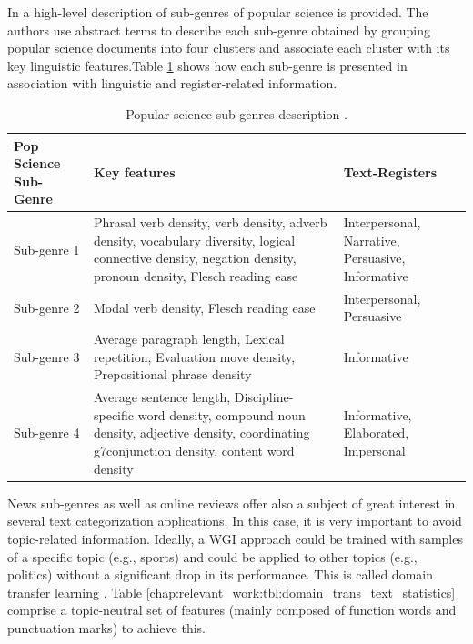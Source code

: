 In \parencite{lieungnapar2017genre} a high-level description of sub-genres of popular science is provided. The authors use abstract terms to describe each sub-genre obtained by grouping popular science documents into four clusters and associate each cluster with its key linguistic features.Table \ref{chap:relevant_work:tbl:pop_science_registers_features} shows how each sub-genre is presented in association with linguistic and register-related information.

\begin{table}[t]
	\center
	\caption {Popular science sub-genres description \parencite{lieungnapar2017genre}.}\label{chap:relevant_work:tbl:pop_science_registers_features}
	\begin{tabular}{p{4cm}p{7cm}p{3cm}}
		\hline
		Pop Science Sub-Genre & Key features & Text-Registers \\
		\hline
		 Sub-genre 1 & Phrasal verb density, verb density, adverb density, vocabulary diversity, logical connective density, negation density, pronoun density, Flesch reading ease & Interpersonal, Narrative, Persuasive, Informative \\
         Sub-genre 2 & Modal verb density, Flesch reading ease & Interpersonal, Persuasive \\
         Sub-genre 3 & Average paragraph length, Lexical repetition, Evaluation move density, Prepositional phrase density & Informative\\
         Sub-genre 4 & Average sentence length, Discipline-specific word density, compound noun density, adjective density, coordinating g7conjunction density, content word density & Informative, Elaborated, Impersonal  \\
  		\hline
	\end{tabular}
\end{table}

News sub-genres as well as online reviews offer also a subject of great interest in several text categorization applications. In this case, it is very important to avoid topic-related information. Ideally, a WGI approach could be trained with samples of a specific topic (e.g., sports) and could be applied to other topics (e.g., politics) without a significant drop in its performance. This is called {domain transfer} learning \parencite{finn2006learning}. Table \ref{chap:relevant_work:tbl:domain_trans_text_statistics} comprise a topic-neutral set of features (mainly composed of function words and punctuation marks) to achieve this. 

